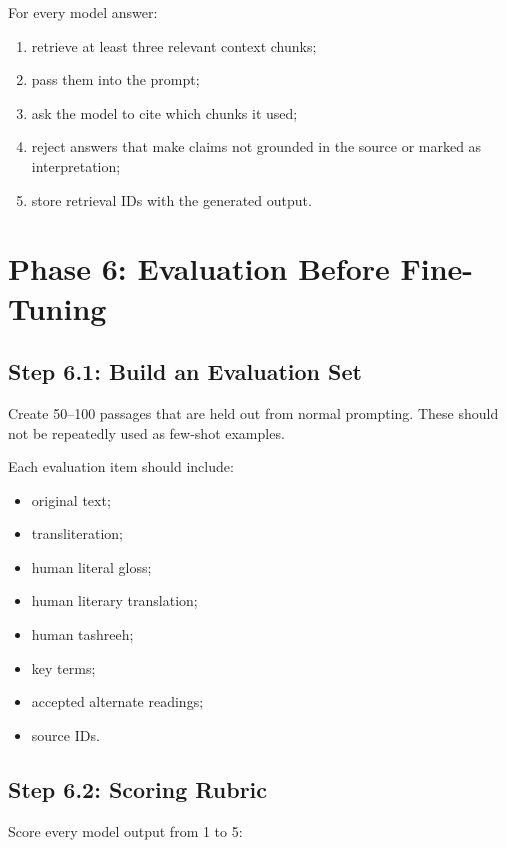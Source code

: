 \documentclass[11pt]{article}
\begin{document}
For every model answer:

\begin{enumerate}
  \item retrieve at least three relevant context chunks;
  \item pass them into the prompt;
  \item ask the model to cite which chunks it used;
  \item reject answers that make claims not grounded in the source or marked as
  interpretation;
  \item store retrieval IDs with the generated output.
\end{enumerate}

\section{Phase 6: Evaluation Before Fine-Tuning}

\subsection{Step 6.1: Build an Evaluation Set}

Create 50--100 passages that are held out from normal prompting. These should not
be repeatedly used as few-shot examples.

Each evaluation item should include:

\begin{itemize}
  \item original text;
  \item transliteration;
  \item human literal gloss;
  \item human literary translation;
  \item human tashreeh;
  \item key terms;
  \item accepted alternate readings;
  \item source IDs.
\end{itemize}

\subsection{Step 6.2: Scoring Rubric}

Score every model output from 1 to 5:
\end{document}
